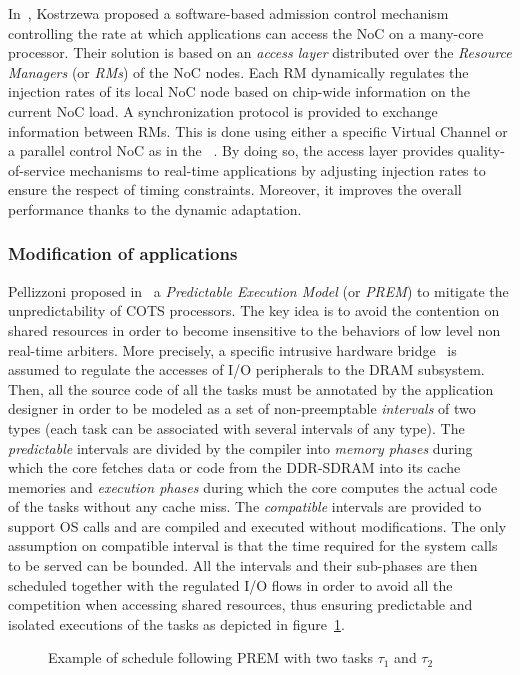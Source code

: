 \documentclass[main.tex]{subfiles}
\begin{document}
In~\cite{Kostrzewa2016}, Kostrzewa \etal proposed a software-based admission control mechanism controlling the rate at which applications can access the NoC on a many-core processor. Their solution is based on an \emph{access layer} distributed over the \emph{Resource Managers}  (or \emph{RMs}) of the NoC nodes. Each RM dynamically regulates the injection rates of its local NoC node based on chip-wide information on the current NoC load. A synchronization protocol is provided to exchange information between RMs. This is done using either a specific Virtual Channel or a parallel control NoC as in the \mppalong~\cite{kalray_mppa}. By doing so, the access layer provides quality-of-service mechanisms to real-time applications by adjusting injection rates to ensure the respect of timing constraints. Moreover, it improves the overall performance thanks to the dynamic adaptation.



\subsubsection{Modification of applications}
Pellizzoni \etal proposed in~\cite{Pellizzoni2011_PREM} a \emph{Predictable Execution Model} (or \emph{PREM}) to mitigate the unpredictability of COTS processors. The key idea is to avoid the contention on shared resources in order to become insensitive to the behaviors of low level non real-time arbiters. More precisely, a specific intrusive hardware bridge~\cite{Betti13} is assumed to regulate the accesses of I/O peripherals to the DRAM subsystem. Then, all the source code of all the tasks must be annotated by the application designer in order to be modeled as a set of non-preemptable \emph{intervals} of two types (each task can be associated with several intervals of any type). The \emph{predictable} intervals are divided by the compiler into \emph{memory phases} during which the core fetches data or code from the DDR-SDRAM into its cache memories and \emph{execution phases} during which the core computes the actual code of the tasks without any cache miss. The \emph{compatible} intervals are provided to support OS calls and are compiled and executed without modifications. The only assumption on compatible interval is that the time required for the system calls to be served can be bounded. All the intervals and their sub-phases are then scheduled together with the regulated I/O flows in order to avoid all the competition when accessing shared resources, thus ensuring predictable and isolated executions of the tasks as depicted in figure~\ref{fig_stateOfTheArt_PREM}. \\
\begin{figure}
    \centering
    
    \caption{Example of schedule following PREM with two tasks $\tau_1$ and $\tau_{2}$}
    \label{fig_stateOfTheArt_PREM}
\end{figure}
\end{document}
